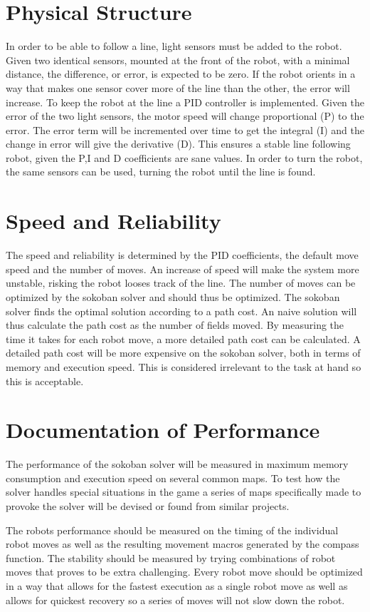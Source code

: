 \documentclass[a4paper,10pt]{article}
\begin{document}
\section{Physical Structure}
In order to be able to follow a line, light sensors must be added to the robot. 
Given two identical sensors, mounted at the front of the robot, with a minimal distance, the difference, or error, is expected to be zero.
If the robot orients in a way that makes one sensor cover more of the line than the other, the error will increase.
To keep the robot at the line a PID controller is implemented.
Given the error of the two light sensors, the motor speed will change proportional (P) to the error.
The error term will be incremented over time to get the integral (I) and the change in error will give the derivative (D).
This ensures a stable line following robot, given the P,I and D coefficients are sane values.
In order to turn the robot, the same sensors can be used, turning the robot until the line is found.

\section{Speed and Reliability}
The speed and reliability is determined by the PID coefficients, the default move speed and the number of moves.
An increase of speed will make the system more unstable, risking the robot looses track of the line.
The number of moves can be optimized by the sokoban solver and should thus be optimized.
The sokoban solver finds the optimal solution according to a path cost.
An naive solution will thus calculate the path cost as the number of fields moved.
By measuring the time it takes for each robot move, a more detailed path cost can be calculated.
A detailed path cost will be more expensive on the sokoban solver, both in terms of memory and execution speed.
This is considered irrelevant to the task at hand so this is acceptable.

\section{Documentation of Performance}
The performance of the sokoban solver will be measured in maximum memory consumption and execution speed on several common maps.
To test how the solver handles special situations in the game a series of maps specifically made to provoke the solver will be devised or found from similar projects.

The robots performance should be measured on the timing of the individual robot moves as well as the resulting movement macros generated by the compass function.
The stability should be measured by trying combinations of robot moves that proves to be extra challenging.
Every robot move should be optimized in a way that allows for the fastest execution as a single robot move as well as allows for quickest recovery so a series of moves will not slow down the robot.
\end{document}

